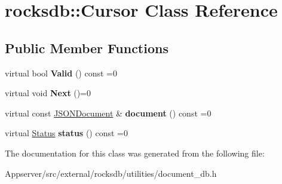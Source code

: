 \hypertarget{classrocksdb_1_1Cursor}{}\section{rocksdb\+:\+:Cursor Class Reference}
\label{classrocksdb_1_1Cursor}
\subsection*{Public Member Functions}
\begin{DoxyCompactItemize}
\item 
virtual bool {\bfseries Valid} () const =0\hypertarget{classrocksdb_1_1Cursor_ab0f9db8bcb8dde0cd98c8af7f0b90d62}{}\label{classrocksdb_1_1Cursor_ab0f9db8bcb8dde0cd98c8af7f0b90d62}

\item 
virtual void {\bfseries Next} ()=0\hypertarget{classrocksdb_1_1Cursor_ad70946cd8e18b40bcbda6e85fe8c24e0}{}\label{classrocksdb_1_1Cursor_ad70946cd8e18b40bcbda6e85fe8c24e0}

\item 
virtual const \hyperlink{classrocksdb_1_1JSONDocument}{J\+S\+O\+N\+Document} \& {\bfseries document} () const =0\hypertarget{classrocksdb_1_1Cursor_ac823ca7c2c4e3db19c67c9636ad31be1}{}\label{classrocksdb_1_1Cursor_ac823ca7c2c4e3db19c67c9636ad31be1}

\item 
virtual \hyperlink{classrocksdb_1_1Status}{Status} {\bfseries status} () const =0\hypertarget{classrocksdb_1_1Cursor_a2e7e4a0c21f9a9702a19c1af4090a6c7}{}\label{classrocksdb_1_1Cursor_a2e7e4a0c21f9a9702a19c1af4090a6c7}

\end{DoxyCompactItemize}


The documentation for this class was generated from the following file\+:\begin{DoxyCompactItemize}
\item 
Appserver/src/external/rocksdb/utilities/document\+\_\+db.\+h\end{DoxyCompactItemize}
